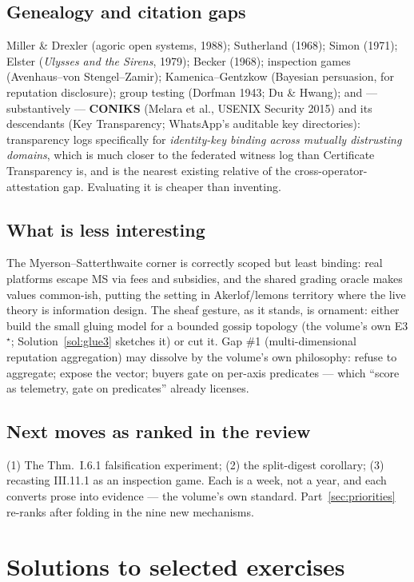 \documentclass[11pt,a4paper]{article}
\theoremstyle{definition}
\theoremstyle{remark}
\begin{document}
\subsection{Genealogy and citation gaps}
Miller \& Drexler (agoric open systems, 1988); Sutherland (1968); Simon (1971); Elster (\emph{Ulysses and the Sirens}, 1979); Becker (1968); inspection games (Avenhaus--von Stengel--Zamir); Kamenica--Gentzkow (Bayesian persuasion, for reputation disclosure); group testing (Dorfman 1943; Du \& Hwang); and --- substantively --- \textbf{CONIKS} (Melara et al., USENIX Security 2015) and its descendants (Key Transparency; WhatsApp's auditable key directories): transparency logs specifically for \emph{identity-key binding across mutually distrusting domains}, which is much closer to the federated witness log than Certificate Transparency is, and is the nearest existing relative of the cross-operator-attestation gap. Evaluating it is cheaper than inventing.

\subsection{What is less interesting}
The Myerson--Satterthwaite corner is correctly scoped but least binding: real platforms escape MS via fees and subsidies, and the shared grading oracle makes values common-ish, putting the setting in Akerlof/lemons territory where the live theory is information design. The sheaf gesture, as it stands, is ornament: either build the small gluing model for a bounded gossip topology (the volume's own E3$^\star$; Solution~\ref{sol:glue3} sketches it) or cut it. Gap \#1 (multi-dimensional reputation aggregation) may dissolve by the volume's own philosophy: refuse to aggregate; expose the vector; buyers gate on per-axis predicates --- which ``score as telemetry, gate on predicates'' already licenses.

\subsection{Next moves as ranked in the review}
(1) The Thm.~I.6.1 falsification experiment; (2) the split-digest corollary; (3) recasting III.11.1 as an inspection game. Each is a week, not a year, and each converts prose into evidence --- the volume's own standard. Part~\ref{sec:priorities} re-ranks after folding in the nine new mechanisms.

\section{Solutions to selected exercises}\label{sec:sols}
\end{document}
